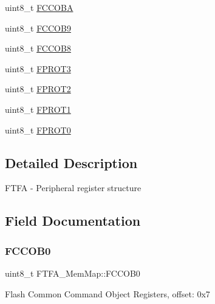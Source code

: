 \begin{DoxyCompactItemize}
\item 
uint8\+\_\+t \hyperlink{struct_f_t_f_a___mem_map_ab167db24e2f5b86e4498c713331b41fc}{F\+C\+C\+O\+BA}
\item 
uint8\+\_\+t \hyperlink{struct_f_t_f_a___mem_map_ad58eb2c520219ec46caa68d6556dc479}{F\+C\+C\+O\+B9}
\item 
uint8\+\_\+t \hyperlink{struct_f_t_f_a___mem_map_a4827886fc87b827ebb288972ff05f5c3}{F\+C\+C\+O\+B8}
\item 
uint8\+\_\+t \hyperlink{struct_f_t_f_a___mem_map_ad373eeb57136eb15831fa521d94d7858}{F\+P\+R\+O\+T3}
\item 
uint8\+\_\+t \hyperlink{struct_f_t_f_a___mem_map_a86f1c8547579b9a1b381c2f7fdaf03ef}{F\+P\+R\+O\+T2}
\item 
uint8\+\_\+t \hyperlink{struct_f_t_f_a___mem_map_a74c0cb8e137d3f4df7283f4b15203845}{F\+P\+R\+O\+T1}
\item 
uint8\+\_\+t \hyperlink{struct_f_t_f_a___mem_map_aba5bfab2704e58af5ecacdb6b7faccbc}{F\+P\+R\+O\+T0}
\end{DoxyCompactItemize}


\subsection{Detailed Description}
F\+T\+FA -\/ Peripheral register structure 

\subsection{Field Documentation}
\mbox{\label{struct_f_t_f_a___mem_map_a00d6a6b8dd8b276346a2ed32e74d1e5a}} 
\subsubsection{\texorpdfstring{F\+C\+C\+O\+B0}{FCCOB0}}
{\footnotesize\ttfamily uint8\+\_\+t F\+T\+F\+A\+\_\+\+Mem\+Map\+::\+F\+C\+C\+O\+B0}

Flash Common Command Object Registers, offset\+: 0x7 \mbox{\label{struct_f_t_f_a___mem_map_a735b6bacdf0355f01b021572da2dc49c}} 

